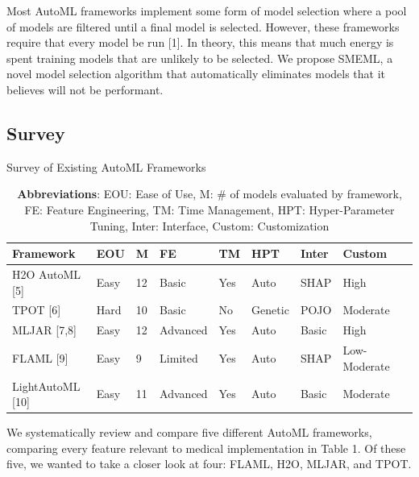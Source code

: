 \documentclass{article}
\begin{document}
Most AutoML frameworks implement some form of model selection where a pool of models are filtered until a final model is selected. However, these frameworks require that every model be run [1]. In theory, this means that much energy is spent training models that are unlikely to be selected. We propose SMEML, a novel model selection algorithm that automatically eliminates models that it believes will not be performant. 

\subsection{Survey}

\begin{table}
  \caption{Survey of Existing AutoML Frameworks}
  \label{automl-survey}
  \centering
  \begin{tabular}{lllllllll}
    \toprule
    Framework & EOU & M & FE & TM & HPT & Inter & Custom\\
    \midrule
    H2O AutoML [5] & Easy & 12 & Basic & Yes & Auto & SHAP & High\\
    TPOT [6] & Hard & 10 & Basic & No & Genetic & POJO & Moderate\\
    MLJAR [7,8] & Easy & 12 & Advanced & Yes & Auto & Basic & High\\
    FLAML [9] & Easy & 9 & Limited & Yes & Auto & SHAP & Low-Moderate\\
    LightAutoML [10] & Easy & 11 & Advanced & Yes & Auto & Basic & Moderate\\
    \bottomrule
  \end{tabular}
  \captionsetup{font=footnotesize}
  \caption*{\textbf{Abbreviations}: EOU: Ease of Use, M: \# of models evaluated by framework, FE: Feature Engineering, TM: Time Management, HPT: Hyper-Parameter Tuning, Inter: Interface, Custom: Customization}
\end{table}
We systematically review and compare five different AutoML frameworks, comparing every feature relevant to medical implementation in Table 1. Of these five, we wanted to take a closer look at four: FLAML, H2O, MLJAR, and TPOT.
\end{document}
